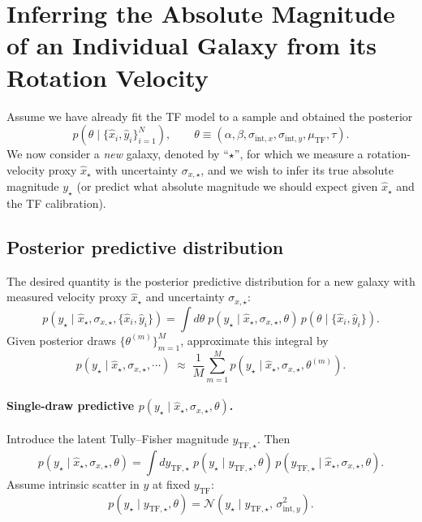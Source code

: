 \section{Inferring the Absolute Magnitude of an Individual Galaxy from its Rotation Velocity}
\label{sec:infer_single_galaxy_y}

Assume we have already fit the TF model to a sample and obtained the posterior
\begin{equation}
p(\theta \mid \{\hat x_i,\hat y_i\}_{i=1}^N),
\qquad
\theta \equiv (\alpha,\beta,\sigma_{\text{int},x},\sigma_{\text{int},y}, \mu_{\mathrm{TF}}, \tau).
\end{equation}
We now consider a \emph{new} galaxy, denoted by ``$\star$'', for which we measure a rotation-velocity proxy
$\hat x_\star$ with uncertainty $\sigma_{x,\star}$, and we wish to infer its true absolute magnitude $y_\star$
(or predict what absolute magnitude we should expect given $\hat x_\star$ and the TF calibration).

\subsection{Posterior predictive distribution}
The desired quantity is the posterior predictive distribution for a new galaxy with
measured velocity proxy $\hat x_\star$ and uncertainty $\sigma_{x,\star}$:
\begin{equation}
p\!\left(y_\star \mid \hat x_\star, \sigma_{x,\star}, \{\hat x_i,\hat y_i\}\right)
=
\int d\theta\;
p\!\left(y_\star \mid \hat x_\star, \sigma_{x,\star}, \theta\right)\,
p\!\left(\theta \mid \{\hat x_i,\hat y_i\}\right).
\label{eq:posterior_predictive_y}
\end{equation}
Given posterior draws $\{\theta^{(m)}\}_{m=1}^M$, approximate this integral by
\begin{equation}
p\!\left(y_\star \mid \hat x_\star, \sigma_{x,\star}, \cdots\right)
\;\approx\;
\frac{1}{M}\sum_{m=1}^M
p\!\left(y_\star \mid \hat x_\star, \sigma_{x,\star}, \theta^{(m)}\right).
\end{equation}

\paragraph{Single-draw predictive $p(y_\star \mid \hat x_\star,\sigma_{x,\star},\theta)$.}
Introduce the latent Tully--Fisher magnitude $y_{\mathrm{TF},\star}$. Then
\begin{equation}
p\!\left(y_\star \mid \hat x_\star,\sigma_{x,\star},\theta\right)
=
\int dy_{\mathrm{TF},\star}\;
p\!\left(y_\star \mid y_{\mathrm{TF},\star},\theta\right)\,
p\!\left(y_{\mathrm{TF},\star} \mid \hat x_\star,\sigma_{x,\star},\theta\right).
\label{eq:pred_y_integral_yTF}
\end{equation}
Assume intrinsic scatter in $y$ at fixed $y_{\mathrm{TF}}$:
\begin{equation}
p\!\left(y_\star \mid y_{\mathrm{TF},\star},\theta\right)
=
\mathcal N\!\left(y_\star \mid y_{\mathrm{TF},\star},\,\sigma_{\mathrm{int},y}^2\right).
\label{eq:pred_y_given_yTF}
\end{equation}

